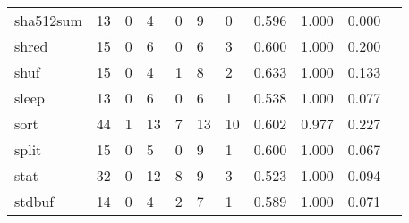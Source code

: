 \begin{longtable}{lp{1.10cm}p{1.10cm}p{1.10cm}p{1.10cm}p{1.10cm}p{1.10cm}p{1.10cm}p{1.10cm}p{1.10cm}p{1.10cm}}
sha512sum &                     13 &                                  0 &                                 4 &                                0 &                                 9 &                               0 &                          0.596 &                                 1.000 &                               0.000 \\
shred     &                     15 &                                  0 &                                 6 &                                0 &                                 6 &                               3 &                          0.600 &                                 1.000 &                               0.200 \\
shuf      &                     15 &                                  0 &                                 4 &                                1 &                                 8 &                               2 &                          0.633 &                                 1.000 &                               0.133 \\
sleep     &                     13 &                                  0 &                                 6 &                                0 &                                 6 &                               1 &                          0.538 &                                 1.000 &                               0.077 \\
sort      &                     44 &                                  1 &                                13 &                                7 &                                13 &                              10 &                          0.602 &                                 0.977 &                               0.227 \\
split     &                     15 &                                  0 &                                 5 &                                0 &                                 9 &                               1 &                          0.600 &                                 1.000 &                               0.067 \\
stat      &                     32 &                                  0 &                                12 &                                8 &                                 9 &                               3 &                          0.523 &                                 1.000 &                               0.094 \\
stdbuf    &                     14 &                                  0 &                                 4 &                                2 &                                 7 &                               1 &                          0.589 &                                 1.000 &                               0.071 \\

\end{longtable}
